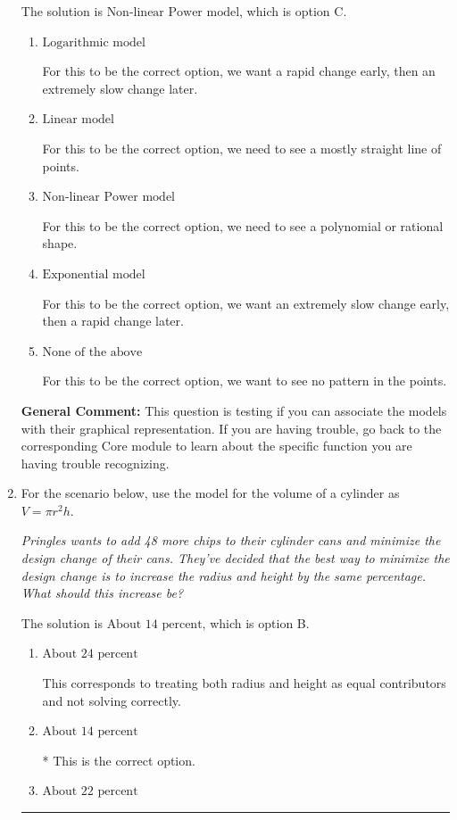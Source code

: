 \documentclass{extbook}[14pt]
\newcommand{\litem}[1]{\item #1

\rule{\textwidth}{0.4pt}}
\begin{document}
\begin{enumerate}
{The solution is \( \text{Non-linear Power model} \), which is option C.\begin{enumerate}[label=\Alph*.]
\item \( \text{Logarithmic model} \)

For this to be the correct option, we want a rapid change early, then an extremely slow change later.
\item \( \text{Linear model} \)

For this to be the correct option, we need to see a mostly straight line of points.
\item \( \text{Non-linear Power model} \)

For this to be the correct option, we need to see a polynomial or rational shape.
\item \( \text{Exponential model} \)

For this to be the correct option, we want an extremely slow change early, then a rapid change later.
\item \( \text{None of the above} \)

For this to be the correct option, we want to see no pattern in the points.
\end{enumerate}

\textbf{General Comment:} This question is testing if you can associate the models with their graphical representation. If you are having trouble, go back to the corresponding Core module to learn about the specific function you are having trouble recognizing.
}
\litem{
For the scenario below, use the model for the volume of a cylinder as $V = \pi r^2 h$.

\begin{center}
    \textit{ Pringles wants to add 48 \text{percent} more chips to their cylinder cans and minimize the design change of their cans. They've decided that the best way to minimize the design change is to increase the radius and height by the same percentage. What should this increase be? }
\end{center}
The solution is \( \text{About } 14 \text{ percent} \), which is option B.\begin{enumerate}[label=\Alph*.]
\item \( \text{About } 24 \text{ percent} \)

This corresponds to treating both radius and height as equal contributors and not solving correctly.
\item \( \text{About } 14 \text{ percent} \)

* This is the correct option.
\item \( \text{About } 22 \text{ percent} \)


\end{enumerate}}
\end{enumerate}
\end{document}

